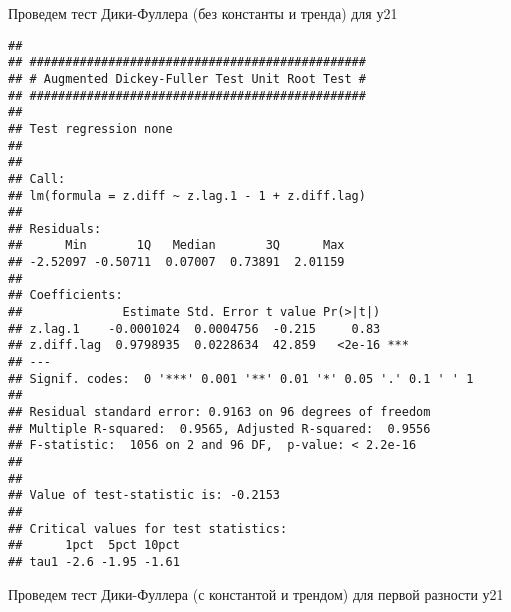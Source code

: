 \documentclass[
]{article}
\newenvironment{Shaded}{\begin{snugshade}}{\end{snugshade}}
\newcommand{\AttributeTok}[1]{\textcolor[rgb]{0.13,0.29,0.53}{#1}}
\newcommand{\FunctionTok}[1]{\textcolor[rgb]{0.13,0.29,0.53}{\textbf{#1}}}
\newcommand{\NormalTok}[1]{#1}
\newcommand{\OtherTok}[1]{\textcolor[rgb]{0.56,0.35,0.01}{#1}}
\newcommand{\SpecialCharTok}[1]{\textcolor[rgb]{0.81,0.36,0.00}{\textbf{#1}}}
\newcommand{\StringTok}[1]{\textcolor[rgb]{0.31,0.60,0.02}{#1}}
\begin{document}
Проведем тест Дики-Фуллера (без константы и тренда) для у21

\begin{Shaded}
\end{Shaded}

\begin{verbatim}
## 
## ############################################### 
## # Augmented Dickey-Fuller Test Unit Root Test # 
## ############################################### 
## 
## Test regression none 
## 
## 
## Call:
## lm(formula = z.diff ~ z.lag.1 - 1 + z.diff.lag)
## 
## Residuals:
##      Min       1Q   Median       3Q      Max 
## -2.52097 -0.50711  0.07007  0.73891  2.01159 
## 
## Coefficients:
##              Estimate Std. Error t value Pr(>|t|)    
## z.lag.1    -0.0001024  0.0004756  -0.215     0.83    
## z.diff.lag  0.9798935  0.0228634  42.859   <2e-16 ***
## ---
## Signif. codes:  0 '***' 0.001 '**' 0.01 '*' 0.05 '.' 0.1 ' ' 1
## 
## Residual standard error: 0.9163 on 96 degrees of freedom
## Multiple R-squared:  0.9565, Adjusted R-squared:  0.9556 
## F-statistic:  1056 on 2 and 96 DF,  p-value: < 2.2e-16
## 
## 
## Value of test-statistic is: -0.2153 
## 
## Critical values for test statistics: 
##      1pct  5pct 10pct
## tau1 -2.6 -1.95 -1.61
\end{verbatim}

Проведем тест Дики-Фуллера (с константой и трендом) для первой разности
у21

\begin{Shaded}
\end{Shaded}
\end{document}
